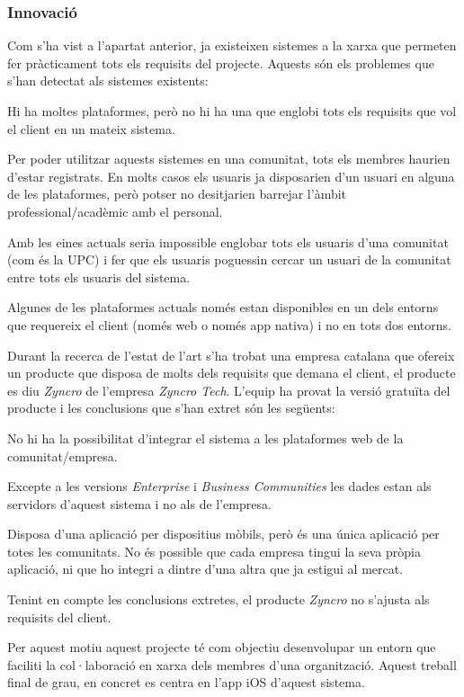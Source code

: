 \subsubsection{Innovació}

Com s'ha vist a l'apartat anterior, ja existeixen sistemes a la xarxa que permeten fer pràcticament tots els requisits del projecte. Aquests són els problemes que s'han detectat als sistemes existents:

\begin{compactitem}
    \item Hi ha moltes plataformes, però no hi ha una que englobi tots els requisits que vol el client en un mateix sistema.
    \item Per poder utilitzar aquests sistemes en una comunitat, tots els membres haurien d'estar registrats. En molts casos els usuaris ja disposarien d'un usuari en alguna de les plataformes, però potser no desitjarien barrejar l'àmbit professional/acadèmic amb el personal.
    \item Amb les eines actuals seria impossible englobar tots els usuaris d'una comunitat (com és la UPC) i fer que els usuaris poguessin cercar un usuari de la comunitat entre tots els usuaris del sistema.
    \item Algunes de les plataformes actuals només estan disponibles en un dels entorns que requereix el client (només web o només app nativa) i no en tots dos entorns.
\end{compactitem}

Durant la recerca de l'estat de l'art s'ha trobat una empresa catalana que ofereix un producte que disposa de molts dels requisits que demana el client, el producte es diu \textit{Zyncro}\cite{zyncro} de l'empresa \textit{Zyncro Tech}. L'equip ha provat la versió gratuïta del producte i les conclusions que s'han extret són les següents:

\begin{compactitem}
    \item No hi ha la possibilitat d'integrar el sistema a les plataformes web de la comunitat/empresa.
    \item Excepte a les versions \textit{Enterprise} i \textit{Business Communities} les dades estan als servidors d'aquest sistema i no als de l'empresa.
    \item Disposa d'una aplicació per dispositius mòbils, però és una única aplicació per totes les comunitats. No és possible que cada empresa tingui la seva pròpia aplicació, ni que ho integri a dintre d'una altra que ja estigui al mercat.
\end{compactitem}

Tenint en compte les conclusions extretes, el producte \textit{Zyncro} no s'ajusta als requisits del client.

Per aquest motiu aquest projecte té com objectiu desenvolupar un entorn que faciliti la col·laboració en xarxa dels membres d'una organització. Aquest treball final de grau, en concret es centra en l'app iOS d'aquest sistema.
